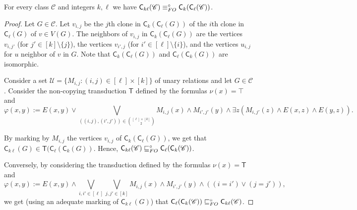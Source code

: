 \documentclass{lmcs}
\newcommand{\Cc}{\mathscr{C}}
\renewcommand{\phi}{\varphi}
\renewcommand{\FO}{{\rm FO}}
\theoremstyle{definition}
\begin{document}
\begin{fact}
	\label{fact:red_copy}
	For every class $\Cc$ and integers $k,\ell$ we have
	$\mathsf C_{k\ell}(\Cc)\equiv_\FO^\circ	\mathsf C_k(\mathsf C_\ell(\Cc))$.
\end{fact}
\begin{proof}
	Let $G\in\Cc$.
	Let $v_{i,j}$ be the $j$th clone
	in $\mathsf C_k(\mathsf C_\ell(G))$ of the $i$th clone in 
	$\mathsf C_\ell(G)$ of $v\in V(G)$.
	The neighbors of $v_{i,j}$ in $\mathsf C_k(\mathsf C_\ell(G))$ are the vertices $v_{i,j'}$ (for $j'\in [k]\setminus\{j\}$), the vertices 
	$v_{i',j}$ (for $i'\in [\ell]\setminus\{i\}$), and the vertices $u_{i,j}$ for $u$ neighbor of $v$ in $G$. Note that $\mathsf C_k(\mathsf C_\ell(G))$ and 
	$\mathsf C_\ell(\mathsf C_k(G))$ are isomorphic.
	
	Consider a set $\mathcal U=\{M_{i,j}\colon (i,j)\in [\ell]\times [k]\}$ of unary relations and let $G\in \Cc$.
	Consider the non-copying transduction $\mathsf T$ defined by the formulas $\nu(x)=\top$ and 
	\[
	\phi(x,y):=E(x,y)\vee \bigvee_{((i,j),(i',j'))\in\binom{[\ell]\times[k]}{2}} 
	M_{i,j}(x)\wedge M_{i',j'}(y)\wedge \exists z 
	(M_{i,j'}(z)\wedge E(x,z)\wedge E(y,z)).
	\]
	
	By marking by $M_{i,j}$ the vertices $v_{i,j}$ of  $\mathsf C_k(\mathsf C_\ell(G))$, we get that $\mathsf C_{k\ell}(G)\in \mathsf T(\mathsf C_\ell(\mathsf C_k(G))$. Hence,
	$\mathsf C_{k\ell}(\Cc)\sqsubseteq_\FO^\circ \mathsf C_\ell(\mathsf C_k(\Cc))$.
	
	Conversely, by considering the transduction defined by
	the formulas $\nu(x)=\mathsf T$ and 
	\[
	\phi(x,y):=E(x,y)\wedge \bigvee_{i,i'\in [\ell]}\bigvee_{j,j'\in [k]}
	M_{i,j}(x)\wedge M_{i',j'}(y)\wedge ((i=i')\vee (j=j')),\] 
	we get (using an adequate marking of $\mathsf C_{k\ell}(G)$)
	that $ \mathsf C_\ell(\mathsf C_k(\Cc))\sqsubseteq_\FO^\circ \mathsf C_{k\ell}(\Cc)$.
\end{proof}
\end{document}
